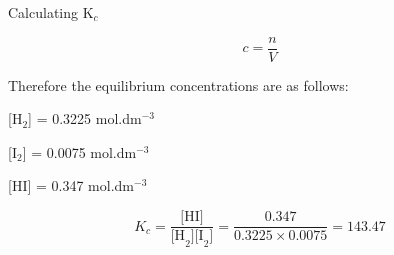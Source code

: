 \begin{wex}{Calculating K$_{c}$\\}
{\begin{equation*}
c = \frac{n}{V}
\end{equation*}

Therefore the equilibrium concentrations are as follows:

[H$_{2}$] = 0.3225 mol.dm$^{-3}$

[I$_{2}$] = 0.0075 mol.dm$^{-3}$

[HI] = 0.347 mol.dm$^{-3}$\\

\begin{equation*}
K_{c} = \frac{\text{[HI]}}{\text{[H}_{2}]\text{[I}_{2}\text{]}} = \frac{0.347}{0.3225 \times 0.0075} = 143.47
\end{equation*}
}
\end{wex}

